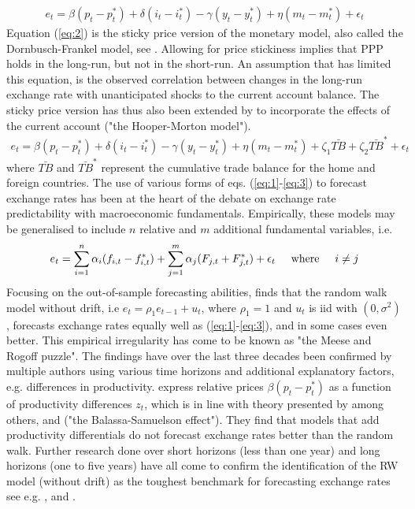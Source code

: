 \documentclass[10pt]{article}
\numberwithin{equation}{section}
\numberwithin{table}{section}
\numberwithin{figure}{section}
\begin{document}
\begin{spacing}{1.5}
\begin{align}
    e_t = \beta\left(p_t - p_t^* \right) + \delta \left(i_t - i_t^* \right) - \gamma \left(y_t - y_t^* \right) + \eta \left(m_t - m_t^* \right) + \epsilon_t
    \label{eq:2}
\end{align}
\noindent Equation (\ref{eq:2}) is the sticky price version of the monetary model, also called the Dornbusch-Frankel model, see \cite{dornbusch1976expectations}. Allowing for price stickiness implies that PPP holds in the long-run, but not in the short-run. An assumption that has limited this equation, is the observed correlation between changes in the long-run exchange rate with unanticipated shocks to the current account balance. The sticky price version has thus also been extended by \cite{hooper1982fluctuations} to incorporate the effects of the current account ("the Hooper-Morton model").
\begin{align}
    e_t = \beta\left(p_t - p_t^* \right) + \delta \left(i_t - i_t^* \right) - \gamma \left(y_t - y_t^* \right) + \eta \left(m_t - m_t^* \right) + \zeta_1\bar{TB} + \zeta_2\bar{TB}^* + \epsilon_t
    \label{eq:3}
\end{align}
\noindent where $\bar{TB}$ and $\bar{TB}^*$ represent the cumulative trade balance for the home and foreign countries. The use of various forms of eqs. (\ref{eq:1}-\ref{eq:3}) to forecast exchange rates has been at the heart of the debate on exchange rate predictability with macroeconomic fundamentals. Empirically, these models may be generalised to include $n$ relative and $m$ additional fundamental variables, i.e.
\begin{align}
e_t = \sum_{i=1}^n\alpha_i(f_{i,t}-f_{i,t}^* )+\sum_{j=1}^m\alpha_j (F_{j,t}+F_{j,t}^*)+\epsilon_t \hspace{0,5cm}\text{where}\hspace{0,5cm} i\neq j
\end{align}
Focusing on the out-of-sample forecasting abilities, \cite{meese1983out,meese1983empirical} finds that the random walk model without drift, i.e  $e_{t} = \rho_1 e_{t-1} + u_t$, where $\rho_1 = 1$ and $u_t$ is iid with $\left(0,\sigma^2 \right)$, forecasts exchange rates equally well as (\ref{eq:1}-\ref{eq:3}), and in some cases even better. This empirical irregularity has come to be known as "the Meese and Rogoff puzzle". The findings have over the last three decades been confirmed by multiple authors using various time horizons and additional explanatory factors, e.g. differences in productivity. \cite{cheung2005empirical} express relative prices $\beta\left(p_t - p_t^* \right)$ as a function of productivity differences $z_t$, which is in line with theory presented by among others, \cite{balassa1964purchasing} and \cite{samuelson1964theoretical} ("the Balassa-Samuelson effect"). They find that models that add productivity differentials do not forecast exchange rates better than the random walk. Further research done over short horizons (less than one year) and long horizons (one to five years) have all come to confirm the identification of the RW model (without drift) as the toughest benchmark for forecasting exchange rates see e.g. \cite{chinn1995banking}, \cite{alquist2008conventional} and \cite{molodtsova2009out}.\\

\end{spacing}
\end{document}
